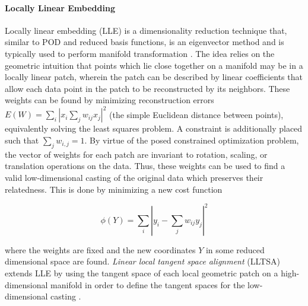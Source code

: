 \paragraph{Locally Linear Embedding} Locally linear embedding (LLE) is a dimensionality reduction technique that, similar to POD and reduced basis functions, is an eigenvector method and is typically used to perform manifold transformation \autocite{saul2000introduction}. The idea relies on the geometric intuition that points which lie close together on a manifold may be in a locally linear patch, wherein the patch can be described by linear coefficients that allow each data point in the patch to be reconstructed by its neighbors. These weights can be found by minimizing reconstruction errors $E(W) = \sum_i | x_i \sum_j w_{ij}x_j|^2$ (the simple Euclidean distance between points), equivalently solving the least squares problem.
A constraint is additionally placed such that $\sum_j w_{i,j} = 1$. By virtue of the posed constrained optimization problem, the vector of weights for each patch are invariant to rotation, scaling, or translation operations on the data. Thus, these weights can be used to find a valid low-dimensional casting of the original data which preserves their relatedness. This is done by minimizing a new cost function 

\begin{equation}
\phi(Y) = \sum_i|y_i - \sum_j w_{ij}y_j|^2
\end{equation}

\noindent where the weights are fixed and the new coordinates $Y$ in some reduced dimensional space are found. \emph{Linear local tangent space alignment} (LLTSA) extends LLE by using the tangent space of each local geometric patch on a high-dimensional manifold in order to define the tangent spaces for the low-dimensional casting \autocite{zhang2007linear}.

